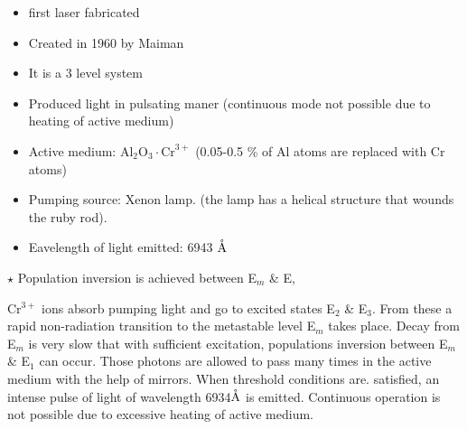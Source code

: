 
\begin{itemize}
	\item first laser fabricated
	\item Created in 1960 by Maiman
	\item It is a 3 level system
	\item Produced light in pulsating maner (continuous mode not possible due to heating of active medium)
	\item Active medium: $\mathrm{Al}_{2} \mathrm{O}_{3} \cdot \mathrm{Cr}^{3+}$ (0.05-0.5 \% of Al atoms are replaced with Cr atoms)
	\item Pumping source: Xenon lamp. (the lamp has a helical structure that wounds the ruby rod).
	\item Eavelength of light emitted: 6943 $\mathring{\textrm{A}}$
\end{itemize}



\vspace{1cm}

$\star$ Population inversion is achieved between E$_m$ \& E,



Cr$^{3+}$ ions absorb pumping light and go to excited states E$_2$ \& E$_3$. From these a rapid non-radiation transition to the metastable level E$_m$ takes place. Decay from E$_m$ is very slow that with sufficient excitation, populations inversion between E$_m$ \& E$_1$ can occur. Those photons are allowed to pass many times in the active medium with the help of mirrors. When threshold conditions are. satisfied, an intense pulse of light of wavelength 6934$\mathring{\textrm{A}}$ is emitted. Continuous operation is not possible due to excessive heating of active medium.
